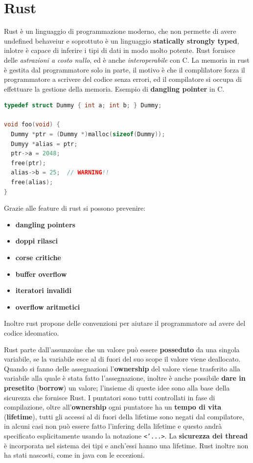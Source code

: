 \documentclass[12pt]{article}
\begin{document}
\section{Rust}
Rust \`e un linguaggio di programmazione moderno, che non permette di avere undefined behaveiur e soprottuto \`e un linguaggio \textbf{statically strongly typed}, inlotre \`e capace di inferire i tipi di dati in modo molto potente. Rust fornisce delle \emph{astrazioni a costo nullo}, ed \`e anche \emph{interoperabile} con C. La memoria in rust \`e gestita dal programmatore solo in parte, il motivo \`e che il complilatore forza il programmatore a scrivere del codice senza errori, ed il compilatore si occupa di effettuare la gestione della memoria. Esempio di \textbf{dangling pointer} in C.
\begin{lstlisting}[language=c]
typedef struct Dummy { int a; int b; } Dummy;

void foo(void) {
  Dummy *ptr = (Dummy *)malloc(sizeof(Dummy));
  Dumyy *alias = ptr;
  ptr->a = 2048;
  free(ptr);
  alias->b = 25;  // WARNING!!
  free(alias);
}
\end{lstlisting}
Grazie alle feature di rust si possono prevenire:
\begin{itemize}
  \item \textbf{dangling pointers}
  \item \textbf{doppi rilasci}
  \item \textbf{corse critiche}
  \item \textbf{buffer overflow}
  \item \textbf{iteratori invalidi}
  \item \textbf{overflow aritmetici}
\end{itemize}
Inoltre rust propone delle convenzioni per aiutare il programmatore ad avere del codice ideomatico.

Rust parte dall'assunzoine che un valore pu\`o essere \textbf{posseduto} da una singola variabile, se la variabile esce al di fuori del suo scope il valore viene deallocato. Quando si fanno delle assegnazioni l'\textbf{ownership} del valore viene trasferito alla variabile alla quale \`e stata fatto l'assegnazione, inoltre \`e anche possibile \textbf{dare in presetito} (\textbf{borrow}) un valore; l'insieme di queste idee sono alla base della sicurezza che fornisce Rust. I puntatori sono tutti controllati in fase di compilazione, oltre all'\textbf{ownership} ogni puntatore ha un \textbf{tempo di vita} (\textbf{lifetime}), tutti gli accessi al di fuori della lifetime sono negati dal compilatore, in alcuni casi non pu\`o essere fatto l'infering della lifetime e questo andr\`a specificato esplicitamente usando la notazione \texttt{<'...>}. La \textbf{sicurezza dei thread} \`e incorporata nel sistema dei tipi e anch'essi hanno una lifetime. Rust inoltre non ha stati nascosti, come in java con le eccezioni.
\end{document}
